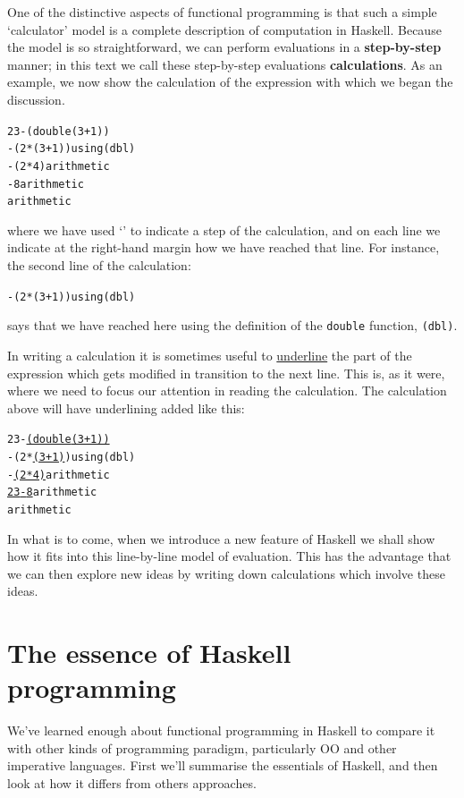 One of the distinctive aspects of functional programming is that such a
simple 
`calculator' model is a complete description of computation in Haskell. Because the model is so straightforward, we can perform
evaluations in a \textbf{step-by-step}
manner; in this text we call these step-by-step evaluations
\textbf{calculations}.
As an example, we now show the calculation of the expression with which we 
began the discussion.
\begin{alltt}
23 - (double (3+1))
 - (2*(3+1))\hfill\textrm{using} \texttt{(dbl)}
 - (2*4) \hfill\textrm{arithmetic}
 - 8 \hfill\textrm{arithmetic}
 \hfill\textrm{arithmetic}
\end{alltt}
where we have used `\step'\index{\step} to indicate a step of the calculation, and on
each line we indicate at the right-hand margin how we have reached that
line. For instance, the second line of the calculation:
\begin{alltt}
 - (2*(3+1))\hfill\textrm{using} \texttt{(dbl)}
\end{alltt}
says that we have reached here using the definition of the
\texttt{double} function, \texttt{(dbl)}.

In writing a calculation it is sometimes useful to \underline{underline}
the part of the expression which gets modified in transition to the next
line. This is, as it were, where we need to focus our attention in
reading the calculation. The calculation above will have underlining
added like this:
\begin{alltt}
23 - \underline{(double (3+1))}
 - (2*\underline{(3+1)})\hfill\textrm{using} \texttt{(dbl)}
 - \underline{(2*4)} \hfill\textrm{arithmetic}
\step \underline{23 - 8} \hfill\textrm{arithmetic}
 \hfill\textrm{arithmetic}
\end{alltt}
In what is to come, when we introduce a new feature of Haskell we shall
show how it fits into this line-by-line model of evaluation. This has
the advantage that we can then explore new ideas by writing down
calculations which involve these ideas.


\section{The essence of Haskell programming}

We've learned enough about functional programming in Haskell to compare it with other kinds of programming paradigm, particularly OO and other imperative languages. First we'll summarise the essentials of Haskell, and then look at how it differs from others approaches.

